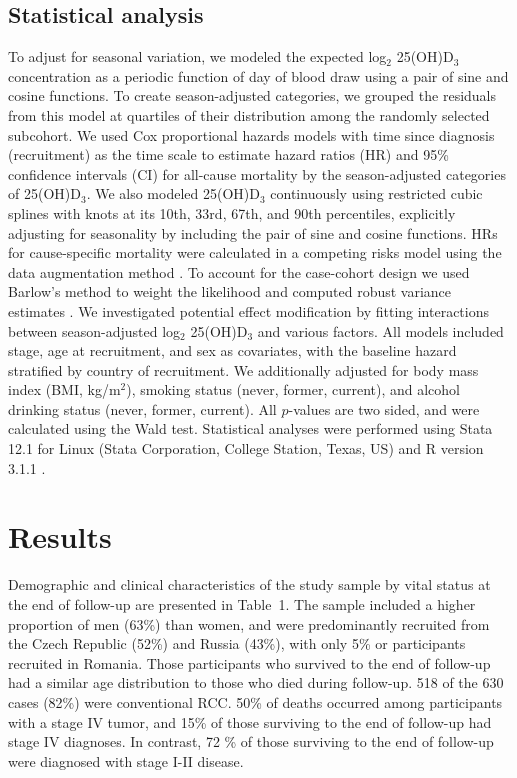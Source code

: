 \documentclass[a4paper,11pt]{article}
\begin{document}
\subsection*{Statistical analysis}
To adjust for seasonal variation, we modeled the expected log$_2$ 25(OH)D$_3$ 
concentration as a periodic function of day of blood draw using a pair of sine 
and cosine functions. To create season-adjusted categories, we grouped the 
residuals from this model at quartiles of their distribution among the randomly 
selected subcohort. We used Cox proportional hazards models with time since 
diagnosis (recruitment) as the time scale to estimate hazard ratios (HR) and 
95\% confidence intervals (CI) for all-cause mortality by the season-adjusted 
categories of 25(OH)D$_3$. We also modeled 25(OH)D$_3$ continuously using 
restricted cubic splines with knots at its 10th, 33rd, 67th, and 90th 
percentiles, explicitly adjusting for seasonality by including the pair of sine 
and cosine functions. HRs for cause-specific mortality were calculated in a 
competing risks model using the data augmentation method 
\cite{lunn_applying_1995}. To account for the case-cohort design 
\cite{prentice_case-cohort_1986} we used Barlow's method to weight the 
likelihood and computed robust variance estimates \cite{barlow_robust_1994, 
barlow_analysis_1999}. We investigated potential effect modification by fitting 
interactions between season-adjusted log$_2$ 25(OH)D$_3$ and various factors. 
All models included stage, age at recruitment, and sex as covariates, with the 
baseline hazard stratified by country of recruitment. We additionally adjusted 
for body mass index (BMI, kg/m$^2$), smoking status (never, former, current), 
and alcohol drinking status (never, former, current).
All $p$-values are two sided, and were calculated using the Wald test. 
Statistical analyses were performed using Stata 12.1 for Linux (Stata 
Corporation, College Station, Texas, US) and R version 3.1.1 \cite{r_2014}.


\section*{Results}
Demographic and clinical characteristics of the study sample by vital status at 
the end of follow-up are presented in Table~1. The sample included a higher 
proportion of men (63\%) than women, and were predominantly recruited from the 
Czech Republic (52\%) and Russia (43\%), with only 5\% or participants 
recruited in Romania. Those participants who survived to the end of follow-up 
had a similar age distribution to those who died during follow-up. 518 
of the 630 cases (82\%) were conventional RCC. 50\% of deaths occurred among 
participants with a stage IV tumor, and 15\% of those surviving to the end of 
follow-up had stage IV diagnoses. In contrast, 72 \% of those surviving to the 
end of follow-up were diagnosed with stage I-II disease.
\end{document}
